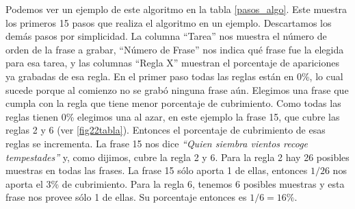 Podemos ver un ejemplo de este algoritmo en la tabla \ref{pasos_algo}. Este muestra los primeros 15 pasos que realiza el algoritmo en un ejemplo. Descartamos los demás pasos por simplicidad. La columna ``Tarea'' nos muestra el número de orden de la frase a grabar, ``Número de Frase'' nos indica qué frase fue la elegida para esa tarea, y las columnas ``Regla X'' muestran el porcentaje de apariciones ya grabadas de esa regla. En el primer paso todas las reglas están en 0\%, lo cual sucede porque al comienzo no se grabó ninguna frase aún.  Elegimos una frase que cumpla con la regla que tiene menor porcentaje de cubrimiento. Como todas las reglas tienen 0\% elegimos una al azar, en este ejemplo la frase 15, que cubre las reglas 2 y 6 (ver \ref{fig22tabla}). Entonces el porcentaje de cubrimiento de esas reglas se incrementa. 
La frase 15 nos dice \textit{``Quien siembra vientos recoge tempestades''} y, como dijimos, cubre la regla 2 y 6. Para la regla 2 hay 26 posibles muestras en todas las frases. La frase 15 sólo aporta 1 de ellas, entonces $1/26$ nos aporta el 3\% de cubrimiento. Para la regla 6, tenemos 6 posibles muestras y esta frase nos provee sólo 1 de ellas. Su porcentaje entonces es $1/6 = 16\%$. 


